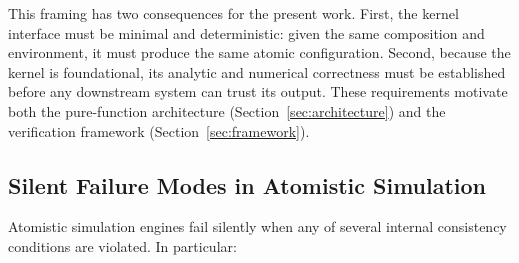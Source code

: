 \documentclass[11pt,twoside]{article}
\begin{document}
This framing has two consequences for the present work. First, the kernel interface must be minimal and deterministic: given the same composition and environment, it must produce the same atomic configuration. Second, because the kernel is foundational, its analytic and numerical correctness must be established before any downstream system can trust its output. These requirements motivate both the pure-function architecture (Section~\ref{sec:architecture}) and the verification framework (Section~\ref{sec:framework}).

\subsection{Silent Failure Modes in Atomistic Simulation}

Atomistic simulation engines fail silently when any of several internal consistency conditions are violated. In particular:
\end{document}
